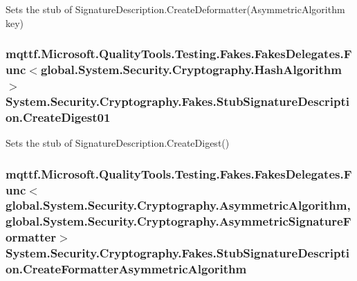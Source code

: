Sets the stub of Signature\-Description.\-Create\-Deformatter(\-Asymmetric\-Algorithm key)

\hypertarget{class_system_1_1_security_1_1_cryptography_1_1_fakes_1_1_stub_signature_description_aef788a57d55e71b0c70f314ba74da70d}{
\subsubsection[{Create\-Digest01}]{\setlength{\rightskip}{0pt plus 5cm}mqttf.\-Microsoft.\-Quality\-Tools.\-Testing.\-Fakes.\-Fakes\-Delegates.\-Func$<$global.\-System.\-Security.\-Cryptography.\-Hash\-Algorithm$>$ System.\-Security.\-Cryptography.\-Fakes.\-Stub\-Signature\-Description.\-Create\-Digest01}}\label{class_system_1_1_security_1_1_cryptography_1_1_fakes_1_1_stub_signature_description_aef788a57d55e71b0c70f314ba74da70d}


Sets the stub of Signature\-Description.\-Create\-Digest()

\hypertarget{class_system_1_1_security_1_1_cryptography_1_1_fakes_1_1_stub_signature_description_a9e4452ad47edd91e123a848cdbf202e6}{
\subsubsection[{Create\-Formatter\-Asymmetric\-Algorithm}]{\setlength{\rightskip}{0pt plus 5cm}mqttf.\-Microsoft.\-Quality\-Tools.\-Testing.\-Fakes.\-Fakes\-Delegates.\-Func$<$global.\-System.\-Security.\-Cryptography.\-Asymmetric\-Algorithm, global.\-System.\-Security.\-Cryptography.\-Asymmetric\-Signature\-Formatter$>$ System.\-Security.\-Cryptography.\-Fakes.\-Stub\-Signature\-Description.\-Create\-Formatter\-Asymmetric\-Algorithm}}\label{class_system_1_1_security_1_1_cryptography_1_1_fakes_1_1_stub_signature_description_a9e4452ad47edd91e123a848cdbf202e6}


